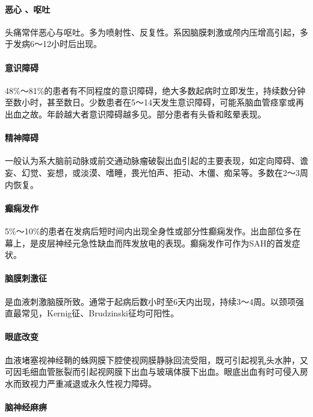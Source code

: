 \paragraph{恶心 、呕吐}

头痛常伴恶心与呕吐。多为喷射性、反复性。系因脑膜刺激或颅内压增高引起，多于发病6～12小时后出现。

\paragraph{意识障碍}

48\%～81\%的患者有不同程度的意识障碍，绝大多数起病时立即发生，持续数分钟至数小时，甚至数日。少数患者在5～14天发生意识障碍，可能系脑血管痉挛或再出血之故。年龄越大者意识障碍越多见。部分患者有头昏和眩晕表现。

\paragraph{精神障碍}

一般认为系大脑前动脉或前交通动脉瘤破裂出血引起的主要表现，如定向障碍、谵妄、幻觉、妄想，或淡漠、嗜睡，畏光怕声、拒动、木僵、痴呆等。多数在2～3周内恢复。

\paragraph{癫痫发作}

5\%～10\%的患者在发病后短时间内出现全身性或部分性癫痫发作。出血部位多在幕上，是皮层神经元急性缺血而阵发放电的表现。癫痫发作可作为SAH的首发症状。

\paragraph{脑膜刺激征}

是血液刺激脑膜所致。通常于起病后数小时至6天内出现，持续3～4周。以颈项强直最常见，Kernig征、Brudzinski征均可阳性。

\paragraph{眼底改变}

血液堵塞视神经鞘的蛛网膜下腔使视网膜静脉回流受阻，既可引起视乳头水肿，又可因毛细血管胀裂而引起视网膜下出血与玻璃体膜下出血。眼底出血有时可侵入房水而致视力严重减退或永久性视力障碍。

\paragraph{脑神经麻痹}

